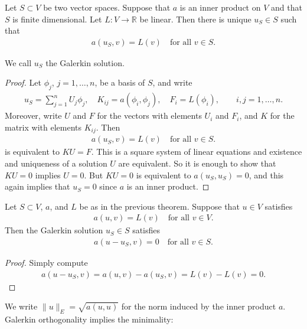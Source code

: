 \documentclass[12pt,oneside]{amsart}
\begin{document}
\begin{theorem}\label{th_gsol}
Let $S \subset V$ be two vector spaces.
Suppose that $a$ is an inner product on $V$ and that $S$ is finite dimensional. 
Let $L : V \to \mathbb R$ be linear. Then there is unique $u_S \in S$ such that 
    \begin{align*}
a(u_S,v) = L(v) \quad \text{for all $v \in S$}.
    \end{align*}
\end{theorem}
We call $u_S$ the Galerkin solution.
\begin{proof}
Let $\phi_j$, $j=1,\dots,n$, be a basis of $S$, and write
    \begin{align*}
u_S = \sum_{j=1}^n U_j \phi_j, 
\quad
K_{ij} = a(\phi_i, \phi_j),
\quad
F_i = L(\phi_i), 
\qquad i,j=1,\dots,n.
    \end{align*}
Moreover, write $U$ and $F$ for the vectors with elements $U_i$ and $F_i$, and $K$ for the matrix with elements $K_{ij}$. Then
    \begin{align*}
a(u_S,v) = L(v) \quad \text{for all $v \in S$}.
    \end{align*}
is equivalent to $KU = F$. This is a square system of linear equations and existence and uniqueness of a solution $U$ are equivalent. So it is enough to show that $KU = 0$ implies $U = 0$. But $KU = 0$ is equivalent to $a(u_S, u_S) = 0$, and this again implies that $u_S = 0$ since $a$ is an inner product.
\end{proof}

\begin{lemma}
Let $S \subset V$, $a$, and $L$ be as in the previous theorem. Suppose that $u \in V$ satisfies
    \begin{align*}
a(u, v) = L(v) \quad \text{for all $v \in V$}.
    \end{align*}
Then the Galerkin solution $u_S  \in S$ satisfies
    \begin{align*}
a(u-u_S,v) = 0 \quad \text{for all $v \in S$}.
    \end{align*}
\end{lemma}
\begin{proof}
Simply compute
    \begin{align*}
a(u-u_S,v) = a(u, v) - a(u_S, v) = L(v) - L(v) = 0.
    \end{align*}
\end{proof}

We write $\|u\|_E = \sqrt{a(u,u)}$ for the norm induced by the inner product $a$. Galerkin orthogonality implies the minimality:
\end{document}
